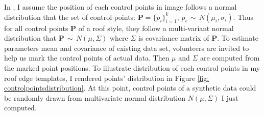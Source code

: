 \documentclass{iitthesis}
\begin{document}
In \cite{ZX:14}, I assume the position of each control points in image follows a normal distribution
that the set of control points: $\textbf{P}=\{p_i\}_{i=1}^k,\, p_i\, \sim\, N(\mu_i, \sigma_i) $. Thus for all control points $\textbf{P}$ of a roof style, they follow a multi-variant normal distribution that $\textbf{P}\, \sim\, N(\mu, \Sigma)$ where $\Sigma$ is covariance matrix of $\textbf{P}$. To estimate parameters mean and covariance of existing data set, volunteers are invited to help us mark the control points of actual data. Then $\mu$ and $\Sigma$ are computed from the marked point positions. To illustrate distribution of each control points in my roof edge templates, I rendered points' distribution in Figure \ref{fig: controlpointsdistribution}. At this point, control points of a synthetic data could be randomly drawn from multivariate normal distribution $N(\mu, \Sigma)$ I just computed. 
\end{document}
